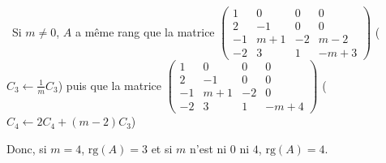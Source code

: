 {{\textbullet~Si $m\neq0$, $A$ a même rang que la matrice $\left(
\begin{array}{cccc}
1&0&0&0\\
2&-1&0&0\\
-1&m+1&-2&m-2\\
-2&3&1&-m+3
\end{array}
\right)
$ ($C_3\leftarrow\frac{1}{m}C_3$) puis que la matrice $\left(
\begin{array}{cccc}
1&0&0&0\\
2&-1&0&0\\
-1&m+1&-2&0\\
-2&3&1&-m+4
\end{array}
\right)
$ ($C_4\leftarrow2C_4+(m-2)C_3$)

Donc, si $m =4$, $\text{rg}(A)= 3$ et si $m$ n'est ni $0$ ni $4$, $\text{rg}(A)=4$.

\begin{center}
\end{center}
}
}

